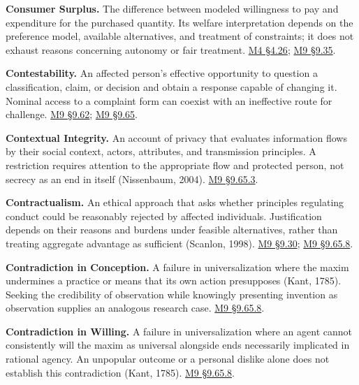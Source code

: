 \noindent\textbf{Consumer Surplus.} The difference between modeled willingness to
pay and expenditure for the purchased quantity. Its welfare
interpretation depends on the preference model, available alternatives,
and treatment of constraints; it does not exhaust reasons concerning
autonomy or fair treatment.
\href{Marketing_Analytics_Lecture_Notes.pdf\#M04-demand-information-pricing-and-consumer-surplus}{M4
§4.26};
\hyperref[M09-identical-tested-demand-and-opposite-welfare-conclusions]{M9
§9.35}.

\noindent\textbf{Contestability.} An affected person's effective opportunity to
question a classification, claim, or decision and obtain a response
capable of changing it. Nominal access to a complaint form can coexist
with an ineffective route for challenge.
\hyperref[M09-reasons-owed-to-the-people-represented]{M9
§9.62};
\hyperref[M09-justifying-restricted-research-to-affected-people]{M9
§9.65}.

\noindent\textbf{Contextual Integrity.} An account of privacy that evaluates
information flows by their social context, actors, attributes, and
transmission principles. A restriction requires attention to the
appropriate flow and protected person, not secrecy as an end in itself
(Nissenbaum, 2004).
\hyperref[M09-a-philosophical-argument-against-protective-secrecy]{M9
§9.65.3}.

\noindent\textbf{Contractualism.} An ethical approach that asks whether
principles regulating conduct could be reasonably rejected by affected
individuals. Justification depends on their reasons and burdens under
feasible alternatives, rather than treating aggregate advantage as
sufficient (Scanlon, 1998).
\hyperref[M09-what-a-company-ought-to-do]{M9
§9.30};
\hyperref[M09-maxims-of-data-production-and-disclosure]{M9
§9.65.8}.

\noindent\textbf{Contradiction in Conception.} A failure in universalization
where the maxim undermines a practice or means that its own action
presupposes (Kant, 1785). Seeking the credibility of observation while
knowingly presenting invention as observation supplies an analogous
research case.
\hyperref[M09-maxims-of-data-production-and-disclosure]{M9
§9.65.8}.

\noindent\textbf{Contradiction in Willing.} A failure in universalization where
an agent cannot consistently will the maxim as universal alongside ends
necessarily implicated in rational agency. An unpopular outcome or a
personal dislike alone does not establish this contradiction (Kant,
1785).
\hyperref[M09-maxims-of-data-production-and-disclosure]{M9
§9.65.8}.

